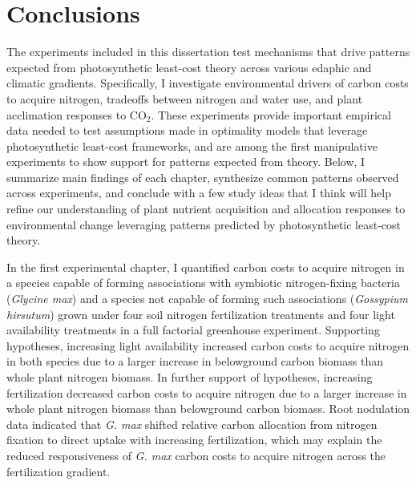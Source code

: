 \chapter{\textbf{Conclusions}}
\noindent The experiments included in this dissertation test mechanisms that drive patterns expected from photosynthetic least-cost theory across various edaphic and climatic gradients. Specifically, I investigate environmental drivers of carbon costs to acquire nitrogen, tradeoffs between nitrogen and water use, and plant acclimation responses to CO$_2$. These experiments provide important empirical data needed to test assumptions made in optimality models that leverage photosynthetic least-cost frameworks, and are among the first manipulative experiments to show support for patterns expected from theory. Below, I summarize main findings of each chapter, synthesize common patterns observed across experiments, and conclude with a few study ideas that I think will help refine our understanding of plant nutrient acquisition and allocation responses to environmental change leveraging patterns predicted by photosynthetic least-cost theory.

In the first experimental chapter, I quantified carbon costs to acquire nitrogen in a species capable of forming associations with symbiotic nitrogen-fixing bacteria (\textit{Glycine max}) and a species not capable of forming such associations (\textit{Gossypium hirsutum}) grown under four soil nitrogen fertilization treatments and four light availability treatments in a full factorial greenhouse experiment. Supporting hypotheses, increasing light availability increased carbon costs to acquire nitrogen in both species due to a larger increase in belowground carbon biomass than whole plant nitrogen biomass. In further support of hypotheses, increasing fertilization decreased carbon costs to acquire nitrogen due to a larger increase in whole plant nitrogen biomass than belowground carbon biomass. Root nodulation data indicated that \textit{G. max} shifted relative carbon allocation from nitrogen fixation to direct uptake with increasing fertilization, which may explain the reduced responsiveness of \textit{G. max} carbon costs to acquire nitrogen across the fertilization gradient. 

